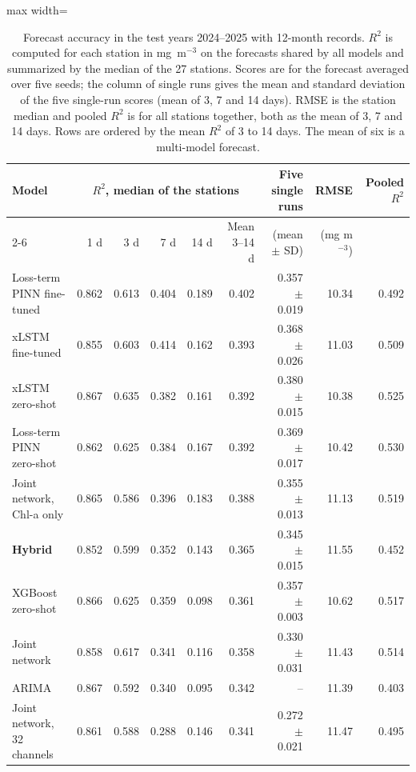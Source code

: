 \begin{table}[tbp]
\centering
\caption{Forecast accuracy in the test years 2024--2025 with 12-month records. $R^2$ is computed for each station in mg~m$^{-3}$ on the forecasts shared by all models and summarized by the median of the 27 stations. Scores are for the forecast averaged over five seeds; the column of single runs gives the mean and standard deviation of the five single-run scores (mean of 3, 7 and 14 days). RMSE is the station median and pooled $R^2$ is for all stations together, both as the mean of 3, 7 and 14 days. Rows are ordered by the mean $R^2$ of 3 to 14 days. The mean of six is a multi-model forecast.}
\label{tab:accuracy12}
\footnotesize
\setlength{\tabcolsep}{4pt}
\begin{adjustbox}{max width=\textwidth}
\begin{tabular}{lrrrrrrrr}
\toprule
Model & \multicolumn{5}{c}{$R^2$, median of the stations} & Five single runs & RMSE & Pooled $R^2$ \\ \cmidrule(lr){2-6}
 & 1 d & 3 d & 7 d & 14 d & Mean 3--14 d & (mean $\pm$ SD) & (mg m$^{-3}$) & \\
\midrule
Loss-term PINN fine-tuned & 0.862 & 0.613 & 0.404 & 0.189 & 0.402 & 0.357 $\pm$ 0.019 & 10.34 & 0.492 \\
xLSTM fine-tuned & 0.855 & 0.603 & 0.414 & 0.162 & 0.393 & 0.368 $\pm$ 0.026 & 11.03 & 0.509 \\
xLSTM zero-shot & 0.867 & 0.635 & 0.382 & 0.161 & 0.392 & 0.380 $\pm$ 0.015 & 10.38 & 0.525 \\
Loss-term PINN zero-shot & 0.862 & 0.625 & 0.384 & 0.167 & 0.392 & 0.369 $\pm$ 0.017 & 10.42 & 0.530 \\
Joint network, Chl-a only & 0.865 & 0.586 & 0.396 & 0.183 & 0.388 & 0.355 $\pm$ 0.013 & 11.13 & 0.519 \\
\textbf{Hybrid} & 0.852 & 0.599 & 0.352 & 0.143 & 0.365 & 0.345 $\pm$ 0.015 & 11.55 & 0.452 \\
XGBoost zero-shot & 0.866 & 0.625 & 0.359 & 0.098 & 0.361 & 0.357 $\pm$ 0.003 & 10.62 & 0.517 \\
Joint network & 0.858 & 0.617 & 0.341 & 0.116 & 0.358 & 0.330 $\pm$ 0.031 & 11.43 & 0.514 \\
ARIMA & 0.867 & 0.592 & 0.340 & 0.095 & 0.342 & -- & 11.39 & 0.403 \\
Joint network, 32 channels & 0.861 & 0.588 & 0.288 & 0.146 & 0.341 & 0.272 $\pm$ 0.021 & 11.47 & 0.495 \\

\end{tabular}
\end{adjustbox}
\end{table}
